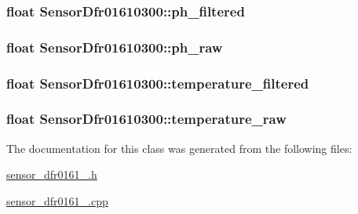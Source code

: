 \subsubsection[{ph\+\_\+filtered}]{\setlength{\rightskip}{0pt plus 5cm}float Sensor\+Dfr01610300\+::ph\+\_\+filtered}\label{class_sensor_dfr01610300_a09ae20cb63d44609c717dda168b8e454}
\hypertarget{class_sensor_dfr01610300_aa0ab70c745bde253adaa343afba56473}{}
\subsubsection[{ph\+\_\+raw}]{\setlength{\rightskip}{0pt plus 5cm}float Sensor\+Dfr01610300\+::ph\+\_\+raw}\label{class_sensor_dfr01610300_aa0ab70c745bde253adaa343afba56473}
\hypertarget{class_sensor_dfr01610300_a598f2f18f66d626a3ce392478fcadcc8}{}
\subsubsection[{temperature\+\_\+filtered}]{\setlength{\rightskip}{0pt plus 5cm}float Sensor\+Dfr01610300\+::temperature\+\_\+filtered}\label{class_sensor_dfr01610300_a598f2f18f66d626a3ce392478fcadcc8}
\hypertarget{class_sensor_dfr01610300_a483485c4c8a91569e8f45819e641e38c}{}
\subsubsection[{temperature\+\_\+raw}]{\setlength{\rightskip}{0pt plus 5cm}float Sensor\+Dfr01610300\+::temperature\+\_\+raw}\label{class_sensor_dfr01610300_a483485c4c8a91569e8f45819e641e38c}


The documentation for this class was generated from the following files\+:\begin{DoxyCompactItemize}
\item 
\hyperlink{sensor__dfr0161__0300_8h}{sensor\+\_\+dfr0161\+\_.\+h}\item 
\hyperlink{sensor__dfr0161__0300_8cpp}{sensor\+\_\+dfr0161\+\_.\+cpp}\end{DoxyCompactItemize}
